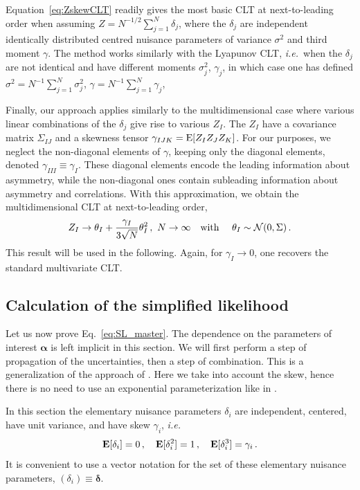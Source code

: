 \documentclass[11pt]{article}
\def\ie{{\it i.e.}}
\newcommand{\be}{\begin{equation}}
\newcommand{\ee}{\end{equation}}
\begin{document}
Equation~\eqref{eq:ZskewCLT}  readily gives the most basic CLT at next-to-leading order when assuming $Z=N^{-1/2}\sum_{j=1}^N \delta_j$, where the $\delta_j$ are  independent identically distributed centred nuisance parameters  of variance $\sigma^2$ and third moment $\gamma$. The method works similarly with the Lyapunov CLT, \ie\ when the $\delta_j$ are not identical and have different moments $\sigma^2_j$, $\gamma_j$, in which case one has defined $\sigma^2=N^{-1}\sum_{j=1}^N \sigma_j^2$, $\gamma=N^{-1}\sum_{j=1}^N \gamma_j$,

Finally, our approach applies similarly to the multidimensional case where various linear combinations of the $\delta_j$ give rise to various $Z_I$. The $Z_I$ have a covariance matrix $\Sigma_{IJ}$ and a skewness tensor $\gamma_{IJK}={\rm E}[Z_IZ_JZ_K]$. For our purposes, we neglect the non-diagonal elements of $\gamma$, keeping only  the diagonal elements, denoted $\gamma_{III}\equiv \gamma_I$. These diagonal elements encode the leading information about asymmetry, while the non-diagonal ones contain subleading information about asymmetry and correlations. With this approximation, we obtain the multidimensional CLT at next-to-leading order,
\be
Z_I\rightarrow \theta_I+\frac{\gamma_{I}}{3\sqrt{N}}\theta_I^2\,,\,\,N\rightarrow \infty  \quad \textrm{with } \quad \theta_I\sim{\cal N}(0,\Sigma)\,. \label{eq:NLCFT}
\ee
 This  result will be used in the following. Again, for $\gamma_I\rightarrow 0$, one recovers the standard multivariate CLT.



\subsection{Calculation of the simplified likelihood}
\label{se:analytic}

Let us now prove Eq.~\eqref{eq:SL_master}.  The dependence on the parameters of interest $\bm{\alpha}$ is left implicit in this section. We will first perform a step of  propagation of the uncertainties, then a step of combination. This is a generalization of the approach of \cite{Fichet:2016gvx}. Here we take into account the skew, hence there is no need to use an exponential parameterization like in \cite{Fichet:2016gvx}.

In this section the elementary nuisance parameters $\delta_i$ are independent, centered, have unit variance, and have skew $\gamma_i$, \ie
\be
{\bf E}[\delta_i]=0\,,\quad {\bf E}[\delta_i^2]=1 \,,\quad {\bf E}[\delta_i^3]=\gamma_i\,.
\ee
It is  convenient to use a vector notation for the set of these elementary nuisance parameters, $(\delta_i)\equiv \boldsymbol{\delta} $.
\end{document}
